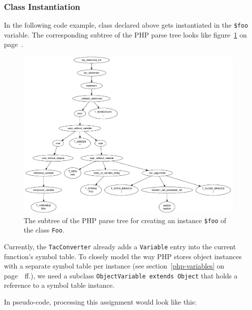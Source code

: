 \subsubsection{Class Instantiation}

In the following code example, class declared above gets instantiated in the \texttt{\$foo} variable. The corresponding subtree of the PHP parse tree looks like figure~\ref{fig:parse-tree-new-foo} on page~\pageref{fig:parse-tree-new-foo}.


\begin{figure}[htb]
  \begin{center}
    \includegraphics[scale=0.5]{images/parsetree-new-foo}
   \caption{The subtree of the PHP parse tree for creating an instance \texttt{\$foo} of the class \texttt{Foo}.}
   \label{fig:parse-tree-new-foo}
  \end{center}
\end{figure}

Currently, the \texttt{TacConverter} already adds a \texttt{Variable} entry into the current function's symbol table. To closely model the way PHP stores object instances with a separate symbol table per instance (see section~\ref{php-variables} on page~\pageref{php-variables}~ff.), we need a subclass \texttt{ObjectVariable extends Object} that holds a reference to a symbol table instance.

In pseudo-code, processing this assignment would look like this:

